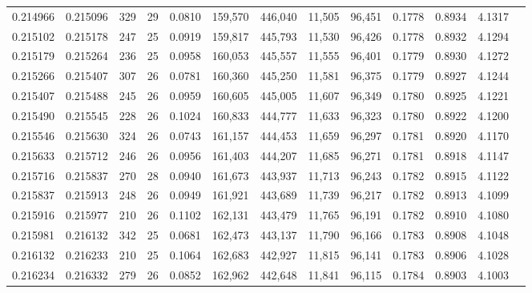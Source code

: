 \begin{tabular}{rrrrrrrrrrrrr}
0.214966 & 0.215096 &   329 &  29 &                                     0.0810 & 159,570 & 446,040 &  11,505 &  96,451 & 0.1778 & 0.8934 & 4.1317 \\
0.215102 & 0.215178 &   247 &  25 &                                     0.0919 & 159,817 & 445,793 &  11,530 &  96,426 & 0.1778 & 0.8932 & 4.1294 \\
0.215179 & 0.215264 &   236 &  25 &                                     0.0958 & 160,053 & 445,557 &  11,555 &  96,401 & 0.1779 & 0.8930 & 4.1272 \\
0.215266 & 0.215407 &   307 &  26 &                                     0.0781 & 160,360 & 445,250 &  11,581 &  96,375 & 0.1779 & 0.8927 & 4.1244 \\
0.215407 & 0.215488 &   245 &  26 &                                     0.0959 & 160,605 & 445,005 &  11,607 &  96,349 & 0.1780 & 0.8925 & 4.1221 \\
0.215490 & 0.215545 &   228 &  26 &                                     0.1024 & 160,833 & 444,777 &  11,633 &  96,323 & 0.1780 & 0.8922 & 4.1200 \\
0.215546 & 0.215630 &   324 &  26 &                                     0.0743 & 161,157 & 444,453 &  11,659 &  96,297 & 0.1781 & 0.8920 & 4.1170 \\
0.215633 & 0.215712 &   246 &  26 &                                     0.0956 & 161,403 & 444,207 &  11,685 &  96,271 & 0.1781 & 0.8918 & 4.1147 \\
0.215716 & 0.215837 &   270 &  28 &                                     0.0940 & 161,673 & 443,937 &  11,713 &  96,243 & 0.1782 & 0.8915 & 4.1122 \\
0.215837 & 0.215913 &   248 &  26 &                                     0.0949 & 161,921 & 443,689 &  11,739 &  96,217 & 0.1782 & 0.8913 & 4.1099 \\
0.215916 & 0.215977 &   210 &  26 &                                     0.1102 & 162,131 & 443,479 &  11,765 &  96,191 & 0.1782 & 0.8910 & 4.1080 \\
0.215981 & 0.216132 &   342 &  25 &                                     0.0681 & 162,473 & 443,137 &  11,790 &  96,166 & 0.1783 & 0.8908 & 4.1048 \\
0.216132 & 0.216233 &   210 &  25 &                                     0.1064 & 162,683 & 442,927 &  11,815 &  96,141 & 0.1783 & 0.8906 & 4.1028 \\
0.216234 & 0.216332 &   279 &  26 &                                     0.0852 & 162,962 & 442,648 &  11,841 &  96,115 & 0.1784 & 0.8903 & 4.1003 \\

\end{tabular}
